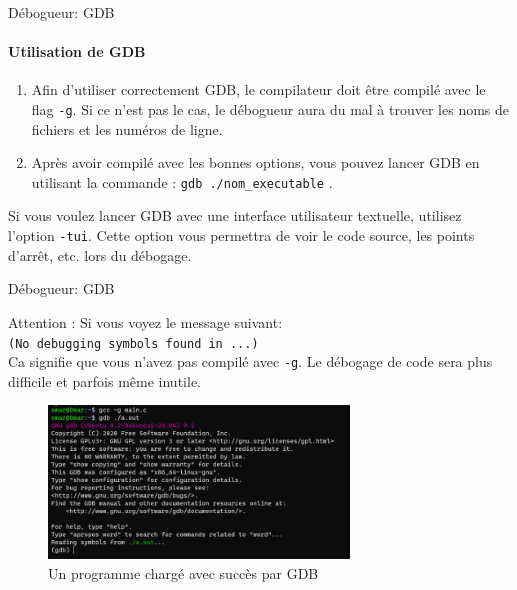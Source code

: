\begin{frame}{Débogueur: GDB}
	\framesubtitle{Utilisation de GDB}
	\begin{enumerate}
		\item Afin d'utiliser correctement GDB, le compilateur \alert{doit} être compilé avec le flag \alert{\texttt{-g}}. Si ce n'est pas le cas, le débogueur aura du mal à trouver les noms de fichiers et les numéros de ligne. \\
		\item Après avoir compilé avec les bonnes options, vous pouvez lancer GDB en utilisant la commande : \alert{\texttt{gdb ./nom\_executable}} .\\ 
	\end{enumerate}
	Si vous voulez lancer GDB avec une interface utilisateur textuelle, utilisez l'option \alert{\texttt{-tui}}. Cette option vous permettra de voir le code source, les points d'arrêt, etc. lors du débogage.
\end{frame}

\begin{frame}{Débogueur: GDB}
	\begin{alertblock}{Attention : }
		Si vous voyez le message suivant: \\
		\texttt{(No debugging symbols found in ...)} \\
		Ca signifie que vous n'avez pas compilé avec \texttt{-g}. Le débogage de code sera plus difficile et parfois même inutile.
	\end{alertblock}
	\begin{figure}[!h]
		\centering
		\includegraphics[width=80mm]{resources/loading_gdb}
		\caption{Un programme chargé avec succès par GDB}
	\end{figure}
\end{frame}
	
